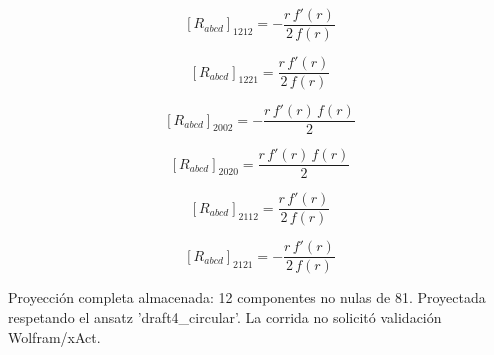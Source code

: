 \documentclass[11pt]{article}
\begin{document}
\begin{dmath*}[breakdepth={5}]
\left[R_{abcd}\right]_{1212} = -\frac{r\,f'\!\left(r\right)}{2\,f\!\left(r\right)}
\end{dmath*}
\par\smallskip
\begin{dmath*}[breakdepth={5}]
\left[R_{abcd}\right]_{1221} = \frac{r\,f'\!\left(r\right)}{2\,f\!\left(r\right)}
\end{dmath*}
\par\smallskip
\begin{dmath*}[breakdepth={5}]
\left[R_{abcd}\right]_{2002} = -\frac{r\,f'\!\left(r\right)\,f\!\left(r\right)}{2}
\end{dmath*}
\par\smallskip
\begin{dmath*}[breakdepth={5}]
\left[R_{abcd}\right]_{2020} = \frac{r\,f'\!\left(r\right)\,f\!\left(r\right)}{2}
\end{dmath*}
\par\smallskip
\begin{dmath*}[breakdepth={5}]
\left[R_{abcd}\right]_{2112} = \frac{r\,f'\!\left(r\right)}{2\,f\!\left(r\right)}
\end{dmath*}
\par\smallskip
\begin{dmath*}[breakdepth={5}]
\left[R_{abcd}\right]_{2121} = -\frac{r\,f'\!\left(r\right)}{2\,f\!\left(r\right)}
\end{dmath*}
\par\smallskip
Proyección completa almacenada: 12 componentes no nulas de 81. Proyectada respetando el ansatz 'draft4\_circular'. La corrida no solicitó validación Wolfram/xAct.\par\medskip
{}
\end{document}
